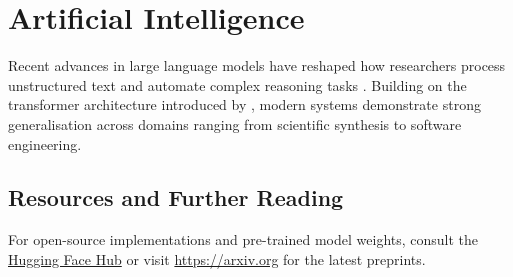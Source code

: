 \section{Artificial Intelligence}
Recent advances in large language models have reshaped how researchers process unstructured text and automate complex reasoning tasks \citep{vaswani2017}. Building on the transformer architecture introduced by , modern systems demonstrate strong generalisation across domains ranging from scientific synthesis to software engineering.

\subsection{Resources and Further Reading}
For open-source implementations and pre-trained model weights, consult the \href{https://huggingface.co}{Hugging Face Hub} or visit \url{https://arxiv.org} for the latest preprints.